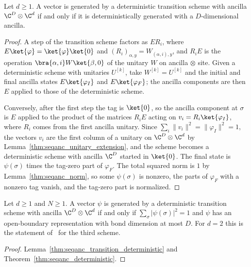 \begin{lemma}
    \label{thm:seqanc_transition_deterministic}
    \leanok
    Let $d\ge 1$. A vector is generated by a deterministic transition scheme
    with ancilla $\C^D\otimes\C^d$ if and only if it is deterministically
    generated with a $D$-dimensional ancilla.
\end{lemma}
\begin{proof}
    \leanok
    A step of the transition scheme factors as $E R_i$, where
    $E\ket{\varphi}=\ket{\varphi}\ket{0}$ and $(R_i)_{\alpha,y}=W_{(\alpha,i),y}$,
    and $R_iE$ is the operation $\bra{\alpha,i}W\ket{\beta,0}$ of the unitary
    $W$ on ancilla $\otimes$ site. Given a deterministic scheme with unitaries
    $U^{[k]}$, take $W^{[k]}=U^{[k]}$ and the initial and final ancilla states
    $E\ket{\varphi_I}$ and $E\ket{\varphi_F}$; the ancilla components are then
    $E$ applied to those of the deterministic scheme.

    Conversely, after the first step the tag is $\ket{0}$, so the ancilla
    component at $\sigma$ is $E$ applied to the product of the matrices $R_iE$
    acting on $v_i=R_i\ket{\varphi_I}$, where $R_i$ comes from the first
    ancilla unitary. Since $\sum_i\|v_i\|^2=\|\varphi_I\|^2=1$, the vectors
    $v_i$ are the first column of a unitary on $\C^D\otimes\C^d$ by
    Lemma~\ref{thm:seqanc_unitary_extension}, and the scheme becomes a
    deterministic scheme with ancilla $\C^D$ started in $\ket{0}$. The final
    state is $\psi(\sigma)$ times the tag-zero part of $\varphi_F$. The total
    squared norm is $1$ by Lemma~\ref{thm:seqanc_norm}, so some
    $\psi(\sigma)$ is nonzero, the parts of $\varphi_F$ with a nonzero tag
    vanish, and the tag-zero part is normalized.
\end{proof}

\begin{lemma}
    \label{thm:seqanc_transition}
    \leanok
    Let $d\ge 1$ and $N\ge 1$. A vector $\psi$ is generated by a deterministic
    transition scheme with ancilla $\C^D\otimes\C^d$ if and only if
    $\sum_\sigma|\psi(\sigma)|^2=1$ and $\psi$ has an open-boundary
    representation with bond dimension at most $D$. For $d=2$ this is the
    statement of~\cite[Section~5, Theorem ``Sequential generation with
        ancilla'']{PerezGarcia2007Matrix} for the third scheme.
\end{lemma}
\begin{proof}
    \leanok
    Lemma~\ref{thm:seqanc_transition_deterministic}
    and Theorem~\ref{thm:seqanc_deterministic}.
\end{proof}

